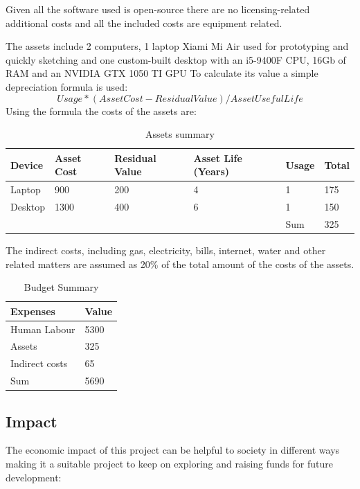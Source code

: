 Given all the software used is open-source there are no licensing-related additional costs and all the included costs are equipment related.

The assets include 2 computers, 1 laptop Xiami Mi Air used for prototyping and quickly sketching and one custom-built desktop with an i5-9400F CPU, 16Gb of RAM and an NVIDIA GTX 1050 TI GPU 
To calculate its value a simple depreciation formula is used:
$$Usage *  (Asset Cost - Residual Value) / Asset Useful Life$$
Using the formula the costs of the assets are:
\begin{table}[h!]
    \centering
    \begin{tabular}{l l l l l l} 
        \hline
        Device & Asset Cost & Residual Value & Asset Life (Years) & Usage & Total \\ [0.5ex] 
        \hline
        Laptop & 900 & 200 &  4 & 1 & 175 \\ 
        Desktop & 1300 & 400 & 6 & 1 & 150 \\
        \hline
        & & & & Sum & 325 \\
        \hline
    \end{tabular}
    \caption{Assets summary}
    \label{table:2}
\end{table}

The indirect costs, including gas, electricity, bills, internet, water and other related matters are assumed as 20\% of the total amount of the costs of the assets.

\begin{table}[h!]
    \centering
    \begin{tabular}{l l} 
        \hline
        Expenses & Value \\
        \hline
        Human Labour & 5300 \\ 
        Assets & 325 \\
        Indirect costs & 65 \\
        \hline
        Sum & 5690 \\
        \hline
    \end{tabular}
    \caption{Budget Summary}
    \label{table:Budget Summary}
\end{table}
\newpage

\subsection{Impact}

The economic impact of this project can be helpful to society in different ways making it a suitable project to keep on exploring and raising funds for future development:

